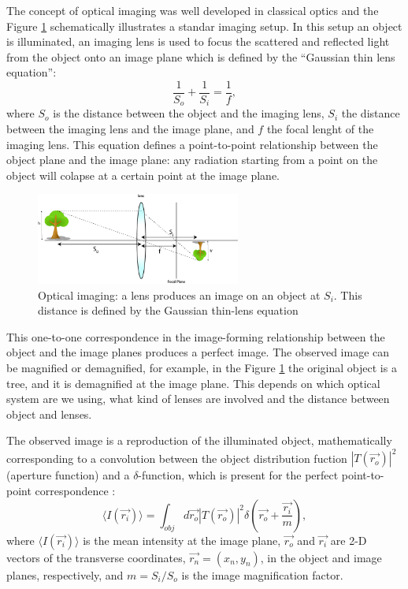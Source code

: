 The concept of optical imaging was well developed in classical optics and the Figure
\ref{fig:imaging} schematically illustrates a standar imaging setup. In this setup 
an object is illuminated, an imaging lens is used 
to focus the scattered and reflected light from the object onto an image plane 
which is defined by the “Gaussian thin lens equation”\cite{hecht}:
\begin{equation}
\frac{1}{S_o}+\frac{1}{S_i}=\frac{1}{f},
\end{equation}
 where $S_o$ is the distance between the object and the imaging lens, $S_i$ the distance 
between the imaging lens and the image plane, and $f$ the focal lenght of the imaging lens. This equation defines
a point-to-point relationship between the object plane and the image plane: any radiation starting from a point on the object will colapse at a certain point at the image plane.
\\
\begin{figure}[h!]
\centering
\includegraphics[width=0.6\textwidth]{Figures/imaging.png}
\caption{Optical imaging: a lens produces an image on an object at $S_i$. This distance is defined
by the Gaussian thin-lens equation} 
\label{fig:imaging}
\end{figure}
This one-to-one correspondence in the image-forming relationship between the object and the image planes produces a perfect image.
The observed image can be magnified or demagnified, for example, in the 
Figure \ref{fig:imaging} the original object is a tree, and it is demagnified at the image plane. This depends on which optical 
system are we using, what kind of lenses are involved and the distance between object and lenses.



The observed image is a reproduction of the illuminated object, mathematically
corresponding to a convolution between the object distribution fuction $ |T(\vec{r_o})|^2$ (aperture function) 
and a $\delta$-function, which is present for the perfect
point-to-point correspondence \cite{introquantumoptics}:
\begin{equation}
\label{eq:intensity}
\langle I(\vec{r_i}) \rangle =\int_{obj} d\vec{r_o} |T(\vec{r_o})|^2 \delta(\vec{r_o}+\frac{\vec{r_i}}{m}),
\end{equation}
where $\langle I(\vec{r_i})\rangle $ is the mean intensity at the image plane, $\vec{r_o}$ and $\vec{r_i}$ are 2-D vectors of the
transverse coordinates, $\vec{r_n}= (x_n,y_n)$, in the object and image planes, respectively, and
$m=S_i/S_o$ is the image magnification factor.


